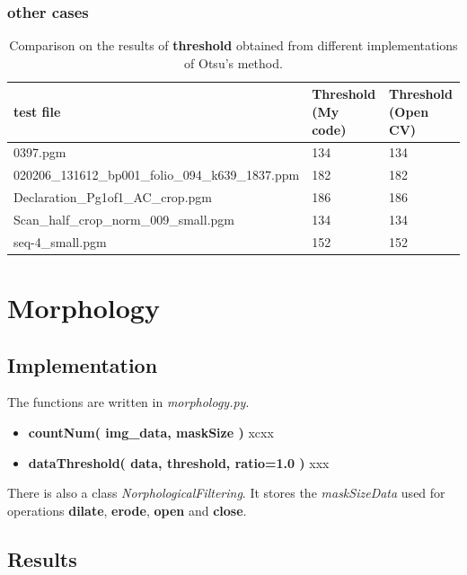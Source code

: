 \documentclass[paper=a4, fontsize=11pt]{scrartcl}
\numberwithin{equation}{section}		%
\numberwithin{figure}{section}			%
\numberwithin{table}{section}				%
\begin{document}
\subsubsection{other cases}

\begin{table}
\label{tab:title}
\caption {Comparison on the results of \textbf{threshold} obtained from different implementations of Otsu's method.}
\begin{center}
\begin{tabular}{ | l | l | l | }
\hline
test file & Threshold (My code) & Threshold (Open CV)  \\ \hline
0397.pgm                                          & 134 & 134 \\ \hline
020206\_131612\_bp001\_folio\_094\_k639\_1837.ppm & 182 & 182 \\ \hline
Declaration\_Pg1of1\_AC\_crop.pgm                 & 186 & 186 \\ \hline
Scan\_half\_crop\_norm\_009\_small.pgm            & 134 & 134 \\ \hline
seq-4\_small.pgm                                  & 152 & 152 \\ \hline
\end{tabular}
\end{center}
\end{table}


\section{Morphology}



\subsection{Implementation}

The functions are written in \emph{morphology.py}.

\begin{itemize}
\item \textbf{ countNum( img\_data, maskSize ) } xcxx
\item \textbf{ dataThreshold( data, threshold, ratio=1.0 ) }  xxx
\end{itemize}

There is also a class \emph{NorphologicalFiltering}.
It stores the \emph{maskSizeData} used for operations \textbf{dilate}, \textbf{erode}, \textbf{open} and \textbf{close}.


\subsection{Results}
\end{document}
